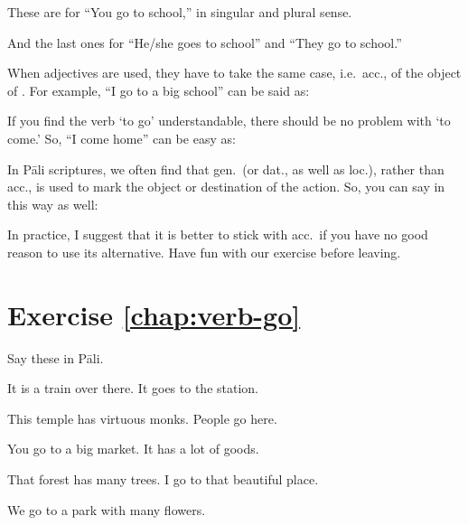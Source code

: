 These are for ``You go to school,'' in singular and plural sense.


And the last ones for ``He/she goes to school'' and ``They go to school.''


When adjectives are used, they have to take the same case, i.e.\ acc., of the object of . For example, ``I go to a big school'' can be said as:


If you find the verb `to go' understandable, there should be no problem with `to come.' So, ``I come home'' can be easy as:


In P\=ali scriptures, we often find that gen.\ (or dat., as well as loc.), rather than acc., is used to mark the object or destination of the action. So, you can say in this way as well:


In practice, I suggest that it is better to stick with acc.\ if you have no good reason to use its alternative. Have fun with our exercise before leaving.

\section*{Exercise \ref{chap:verb-go}}
Say these in P\=ali.
\begin{compactenum}
\item It is a train over there. It goes to the station.
\item This temple has virtuous monks. People go here.
\item You go to a big market. It has a lot of goods.
\item That forest has many trees. I go to that beautiful place.
\item We go to a park with many flowers.
\end{compactenum}
